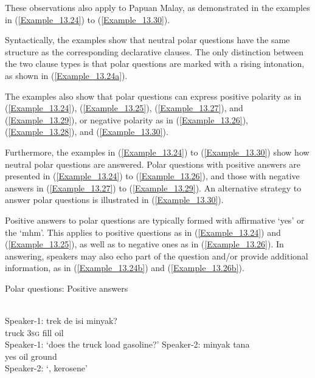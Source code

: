 These observations also apply to Papuan Malay, as demonstrated in the examples in (\ref{Example_13.24}) to (\ref{Example_13.30}).



Syntactically, the examples show that neutral polar questions have the same structure as the corresponding declarative clauses. The only distinction between the two clause types is that polar questions are marked with a rising intonation, as shown in (\ref{Example_13.24a}).



The examples also show that polar questions can express positive polarity as in (\ref{Example_13.24}), (\ref{Example_13.25}), (\ref{Example_13.27}), and (\ref{Example_13.29}), or negative polarity as in (\ref{Example_13.26}), (\ref{Example_13.28}), and (\ref{Example_13.30}).



Furthermore, the examples in (\ref{Example_13.24}) to (\ref{Example_13.30}) show how neutral polar questions are answered. Polar questions with positive answers are presented in (\ref{Example_13.24}) to (\ref{Example_13.26}), and those with negative answers in (\ref{Example_13.27}) to (\ref{Example_13.29}). An alternative strategy to answer polar questions is illustrated in (\ref{Example_13.30}).



Positive answers to polar questions are typically formed with affirmative  ‘yes’ or the   ‘mhm’. This applies to positive questions as in (\ref{Example_13.24}) and (\ref{Example_13.25}), as well as to negative ones as in (\ref{Example_13.26}). In answering, speakers may also echo part of the question and/or provide additional information, as in (\ref{Example_13.24b}) and (\ref{Example_13.26b}).


\begin{styleExampleTitle}
Polar questions: Positive answers
\end{styleExampleTitle}

\ea
\label{Example_13.24}
\ea
\label{Example_13.24a}
\glll \hspace{1.2cm} {\textstyleChBold{-- }}\hspace{2mm} {\textstyleChBold{-- }} {\textstyleChBold{{} -- {} -- }}\hspace{3.5mm}  {\hspace{1.2mm}}\\ %
  {Speaker-1:}  {trek}  {de}  {isi}  {minyak}?\\
 {}    truck  \textsc{3sg}  fill  oil\\
\glt   Speaker-1: ‘does the truck load gasoline?’
\vspace{10pt}
\ex
\label{Example_13.24b}
\gll  Speaker-2:    minyak  tana\\
 {}    yes  oil  ground\\
\glt Speaker-2: ‘, kerosene’ \textstyleExampleSource{[080923-009-Cv.0037-0038]}
\z
\z

